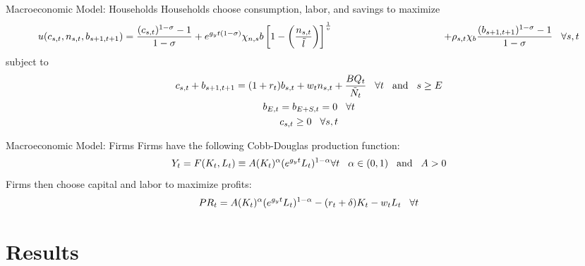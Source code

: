 \documentclass[12pt]{beamer}
\begin{document}
\begin{frame}{Macroeconomic Model: Households}
	Households choose consumption, labor, and savings to maximize
	\begin{dmath*}
		{u(c_{s,t}, n_{s,t}, b_{s+1,t+1}) = \frac{(c_{s,t})^{1-\sigma}-1}{1-\sigma} + e^{g_yt(1-\sigma)}\chi_{n,s}b\left[1-\left(\frac{n_{s,t}}{\tilde{l}}\right)\right]^{\frac{1}{\upsilon}}} \\
		{\hspace{40mm} + \rho_{s,t}\chi_b\frac{(b_{s+1,t+1})^{1-\sigma}-1}{1-\sigma} \hspace{3mm} \forall s,t}
	 \end{dmath*}
	 subject to
	 \begin{gather*}
		c_{s,t} + b_{s+1,t+1} = (1+r_t)b_{s,t} + w_tn_{s,t} + \frac{BQ_t}{\tilde{N}_t} \hspace{3mm} \forall t \hspace{3mm} \text{and} \hspace{3mm} s \geq E \\
		b_{E,t}=b_{E+S,t}=0 \hspace{3mm} \forall t \\
		c_{s,t} \geq 0 \hspace{3mm} \forall s,t
	 \end{gather*}
\end{frame}

\begin{frame}{Macroeconomic Model: Firms}
	Firms have the following Cobb-Douglas production function:
	\begin{equation*}
		Y_t = F(K_t, L_t) \equiv A(K_t)^\alpha(e^{g_yt}L_t)^{1-\alpha} \forall t \hspace{3mm} \alpha \in (0, 1) \hspace{3mm} \text{and} \hspace{3mm} A>0
	\end{equation*}
	Firms then choose capital and labor to maximize profits:
	\begin{equation*}
		PR_t = A(K_t)^\alpha(e^{g_yt}L_t)^{1-\alpha} - (r_t + \delta)K_t - w_tL_t \hspace{3mm} \forall t
	 \end{equation*}
\end{frame}

\section{Results}
\end{document}
